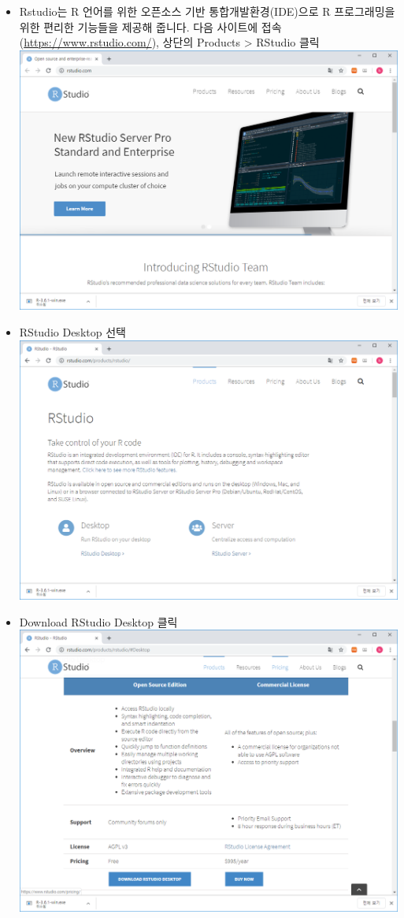 \documentclass[
]{book}
\begin{document}
\begin{itemize}
\item
  Rstudio는 R 언어를 위한 오픈소스 기반 통합개발환경(IDE)으로 R 프로그래밍을 위한 편리한 기능들을 제공해 줍니다. 다음 사이트에 접속 (\url{https://www.rstudio.com/}), 상단의 Products \textgreater{} RStudio 클릭
  \includegraphics{images/01/01-06.PNG}
\item
  RStudio Desktop 선택
  \includegraphics{images/01/01-07.PNG}
\item
  Download RStudio Desktop 클릭
  \includegraphics{images/01/01-08.PNG}

\end{itemize}
\end{document}

